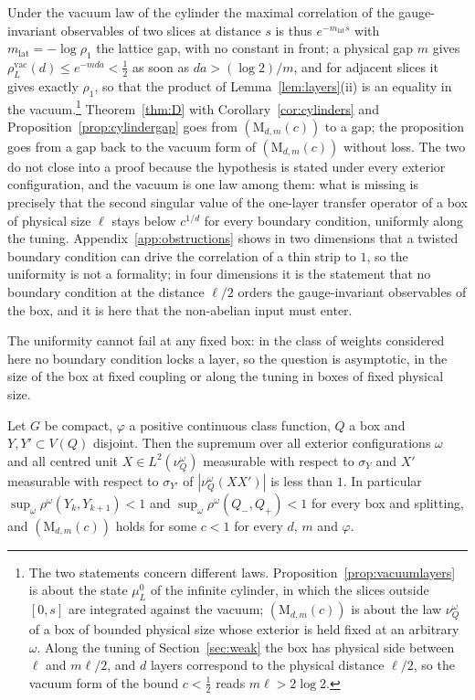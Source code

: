 Under the vacuum law of the cylinder the maximal correlation of the
gauge-invariant observables of two slices at distance $s$ is thus
$e^{-m_{\mathrm{lat}}s}$ with $m_{\mathrm{lat}}=-\log\rho_1$ the lattice
gap, with no constant in front; a physical gap $m$ gives $\rho^{\mathrm
{vac}}_L(d)\le e^{-mda}<\frac12$ as soon as $da>(\log2)/m$, and for
adjacent slices it gives exactly $\rho_1$, so that the product of
Lemma~\ref{lem:layers}(ii) is an equality in the vacuum.\footnote{The
two statements concern different laws. Proposition~\ref{prop:vacuumlayers}
is about the state $\mu^0_L$ of the infinite cylinder, in which the slices
outside $[0,s]$ are integrated against the vacuum; $(\mathrm M_{d,m}(c))$ is
about the law $\nu^\omega_Q$ of a box of bounded physical size whose
exterior is held fixed at an arbitrary $\omega$. Along the tuning of
Section~\ref{sec:weak} the box has physical side between $\ell$ and $m\ell/2$,
and $d$ layers correspond to the physical distance $\ell/2$, so the vacuum
form of the bound $c<\frac12$ reads $m\ell>2\log2$.} Theorem~\ref{thm:D}
with Corollary~\ref{cor:cylinders} and Proposition~\ref{prop:cylindergap}
goes from $(\mathrm M_{d,m}(c))$ to a gap; the proposition goes from a gap
back to the vacuum form of $(\mathrm M_{d,m}(c))$ without loss. The two do
not close into a proof because the hypothesis is stated under every exterior
configuration, and the vacuum is one law among them: what is missing is
precisely that the second singular value of the one-layer transfer operator
of a box of physical size $\ell$ stays below $c^{1/d}$ for every boundary
condition, uniformly along the tuning. Appendix~\ref{app:obstructions} shows
in two dimensions that a twisted boundary condition can drive the
correlation of a thin strip to $1$, so the uniformity is not a formality;
in four dimensions it is the statement that no boundary condition at the
distance $\ell/2$ orders the gauge-invariant observables of the box, and it
is here that the non-abelian input must enter.

The uniformity cannot fail at any fixed box: in the class of weights
considered here no boundary condition locks a layer, so the question is
asymptotic, in the size of the box at fixed coupling or along the tuning
in boxes of fixed physical size.

\begin{proposition}\label{prop:nolock}
Let $G$ be compact, $\varphi$ a positive continuous class function, $Q$ a box
and $Y,Y'\subset V(Q)$ disjoint. Then the supremum over all exterior
configurations $\omega$ and all centred unit $X\in L^2(\nu^\omega_Q)$
measurable with respect to $\sigma_Y$ and $X'$ measurable with respect to
$\sigma_{Y'}$ of $|\nu^\omega_Q(XX')|$ is less than $1$. In particular
$\sup_\omega\rho^\omega(Y_k,Y_{k+1})<1$ and $\sup_\omega\rho^\omega(Q_-,Q_+)<1$
for every box and splitting, and $(\mathrm M_{d,m}(c))$ holds for some
$c<1$ for every $d$, $m$ and $\varphi$.
\end{proposition}

